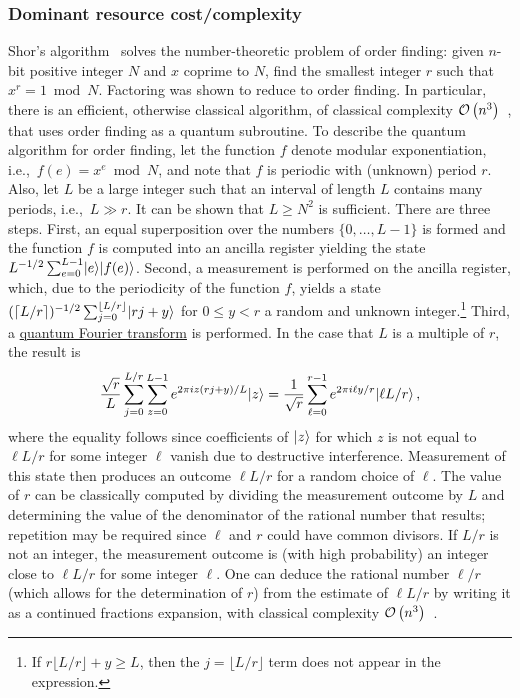\begin{refsection}
\subsubsection*{Dominant resource cost/complexity}

Shor's algorithm~\cite{shor1994Factoring} solves the number-theoretic problem of order finding: given $n$-bit positive integer $N$ and $x$ coprime to $N$, find the smallest integer $r$ such that $x^r=1 \bmod N$. Factoring was shown to reduce to order finding. In particular, there is an efficient, otherwise classical algorithm, of classical complexity $\mathcal{O}\left( n^3 \right)$~\cite{nielsen2002QCQI}, that uses order finding as a quantum subroutine. To describe the quantum algorithm for order finding, let the function $f$ denote modular exponentiation, i.e.,~$f(e) = x^e \bmod N$, and note that $f$ is periodic with (unknown) period $r$. Also, let $L$ be a large integer such that an interval of length $L$ contains many periods, i.e.,~$L \gg r$. It can be shown that $L \geq N^2$ is sufficient. There are three steps. First, an equal superposition over the numbers $\{0,\ldots,L-1\}$ is formed and the function $f$ is computed into an ancilla register yielding the state $L^{-1/2}\sum_{e=0}^{L-1} \lvert e\rangle\lvert f(e)\rangle$. Second, a measurement is performed on the ancilla register, which, due to the periodicity of the function $f$, yields a state $(\lceil L/r \rceil)^{-1/2} \sum_{j=0}^{\lfloor L/r \rfloor}\lvert rj + y\rangle$ for $0\leq y<r$ a random and unknown integer.\footnote{If $r\lfloor L/r \rfloor+y \geq L$, then the $j = \lfloor L/r \rfloor$ term does not appear in the expression.} Third, a \hyperref[prim:QFT]{quantum Fourier transform} is performed. In the case that $L$ is a multiple of $r$, the result is 
\begin{equation}
  \frac{\sqrt{r}}{L}\sum_{j=0}^{L/r} \sum_{z=0}^{L-1}e^{2\pi i z(rj+y)/L} \lvert z\rangle  = \frac{1}{\sqrt{r}}\sum_{\ell=0}^{r-1}e^{2\pi i \ell y/r} \lvert\ell L/r \rangle \,,
\end{equation}
where the equality follows since coefficients of $\lvert z\rangle$ for which $z$ is not equal to $\ell L/r$ for some integer $\ell$ vanish due to destructive interference. Measurement of this state then produces an outcome $\ell L/r$ for a random choice of $\ell$. The value of $r$ can be classically computed by dividing the measurement outcome by $L$ and determining the value of the denominator of the rational number that results; repetition may be required since $\ell $ and $r$ could have common divisors. If $L/r$ is not an integer, the measurement outcome is (with high probability) an integer close to $\ell L / r$ for some integer $\ell$. One can deduce the rational number $\ell/r$ (which allows for the determination of $r$) from the estimate of $\ell L /r$ by writing it as a continued fractions expansion, with classical complexity $\mathcal{O}\left( n^3 \right)$~\cite{nielsen2002QCQI}.


\end{refsection}
